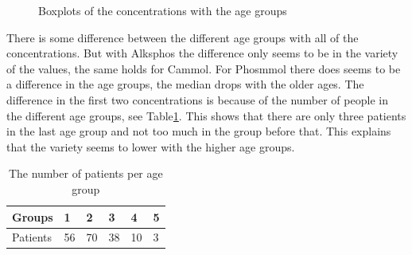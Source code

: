 \documentclass{article}
\begin{document}
\begin{figure}
          \caption{Boxplots of the concentrations with the age groups}
          \label{fig:BoxAgegrp}
      \end{figure}

      There is some difference between the different age groups with all of the concentrations.
      But with Alksphos the difference only seems to be in the variety of the values, the same holds for Cammol.
      For Phosmmol there does seems to be a difference in the age groups, the median drops with the older ages.
      The difference in the first two concentrations is because of the number of people in the different age groups, see Table\ref{table:Agegrp}.
      This shows that there are only three patients in the last age group and not too much in the group before that.
      This explains that the variety seems to lower with the higher age groups.
      
      \begin{table}
        \begin{center}
          \begin{tabular}{|l|lllll|}
          \hline
          Groups&1&2&3&4&5\\
          \hline
          Patients&56&70&38&10&3\\
          \hline
          \end{tabular}
        \end{center}
        \caption{The number of patients per age group}
        \label{table:Agegrp}
      \end{table}
\end{document}

